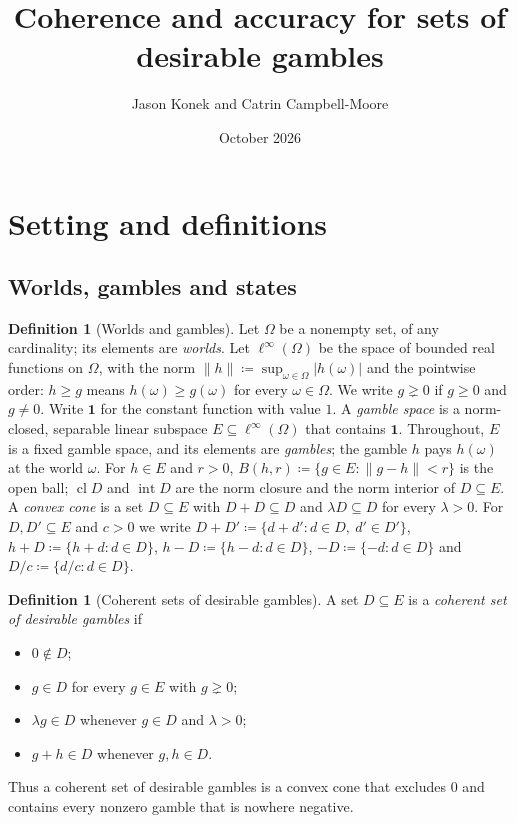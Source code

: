 \documentclass[11pt]{article}
\title{Coherence and accuracy for sets of desirable gambles}
\author{Jason Konek and Catrin Campbell-Moore}
\date{October 2026}
\newcommand{\one}{\mathbf{1}}
\DeclareMathOperator{\cl}{cl}
\DeclareMathOperator{\inter}{int}
\theoremstyle{plain}
\theoremstyle{definition}
\newtheorem{definition}[theorem]{Definition}
\begin{document}
\maketitle

\section{Setting and definitions}\label{sec:setting}

\subsection{Worlds, gambles and states}

\begin{definition}[Worlds and gambles]\label{def:gambles}
Let $\Omega$ be a nonempty set, of any cardinality; its elements are \emph{worlds}. Let
$\ell^\infty(\Omega)$ be the space of bounded real functions on $\Omega$, with the norm
$\|h\|\coloneqq\sup_{\omega\in\Omega}|h(\omega)|$ and the pointwise order: $h\ge g$ means
$h(\omega)\ge g(\omega)$ for every $\omega\in\Omega$. We write $g\gneq0$ if $g\ge0$ and $g\ne0$.
Write $\one$ for the constant function
with value $1$. A \emph{gamble space} is a norm-closed, separable linear subspace
$E\subseteq\ell^\infty(\Omega)$ that contains $\one$. Throughout, $E$ is a fixed gamble space,
and its elements are \emph{gambles}; the gamble $h$ pays $h(\omega)$ at the world $\omega$. For
$h\in E$ and $r>0$, $B(h,r)\coloneqq\{g\in E:\|g-h\|<r\}$ is the open ball; $\cl D$ and
$\inter D$ are the norm closure and the norm interior of $D\subseteq E$. A \emph{convex
cone} is a set $D\subseteq E$ with $D+D\subseteq D$ and $\lambda D\subseteq D$ for every
$\lambda>0$. For $D,D'\subseteq E$ and $c>0$ we write $D+D'\coloneqq\{d+d':d\in D,\ d'\in D'\}$,
$h+D\coloneqq\{h+d:d\in D\}$, $h-D\coloneqq\{h-d:d\in D\}$, $-D\coloneqq\{-d:d\in D\}$ and
$D/c\coloneqq\{d/c:d\in D\}$.
\end{definition}

\begin{definition}[Coherent sets of desirable gambles]\label{def:coherentsets}
A set $D\subseteq E$ is a \emph{coherent set of desirable gambles} if
\begin{itemize}
  \item[(D1)] $0\notin D$;
  \item[(D2)] $g\in D$ for every $g\in E$ with $g\gneq0$;
  \item[(D3)] $\lambda g\in D$ whenever $g\in D$ and $\lambda>0$;
  \item[(D4)] $g+h\in D$ whenever $g,h\in D$.
\end{itemize}
Thus a coherent set of desirable gambles is a convex cone that excludes $0$ and contains every
nonzero gamble that is nowhere negative.
\end{definition}
\end{document}
